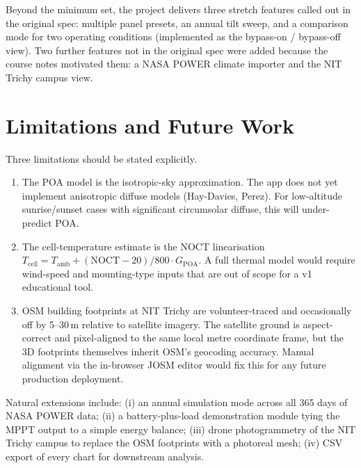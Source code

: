 \documentclass[conference]{IEEEtran}
\begin{document}
Beyond the minimum set, the project delivers three stretch features called out in the original spec: multiple panel presets, an annual tilt sweep, and a comparison mode for two operating conditions (implemented as the bypass-on / bypass-off view). Two further features not in the original spec were added because the course notes motivated them: a NASA POWER climate importer and the NIT Trichy campus view.

\section{Limitations and Future Work}
Three limitations should be stated explicitly.

\begin{enumerate}
\item The POA model is the isotropic-sky approximation. The app does not yet implement anisotropic diffuse models (Hay-Davies, Perez). For low-altitude sunrise/sunset cases with significant circumsolar diffuse, this will under-predict POA.
\item The cell-temperature estimate is the NOCT linearisation $T_\text{cell}=T_\text{amb}+(\text{NOCT}-20)/800\cdot G_\text{POA}$. A full thermal model would require wind-speed and mounting-type inputs that are out of scope for a v1 educational tool.
\item OSM building footprints at NIT Trichy are volunteer-traced and occasionally off by 5--30\,m relative to satellite imagery. The satellite ground is aspect-correct and pixel-aligned to the same local metre coordinate frame, but the 3D footprints themselves inherit OSM's geocoding accuracy. Manual alignment via the in-browser JOSM editor would fix this for any future production deployment.
\end{enumerate}

Natural extensions include: (i) an annual simulation mode across all 365 days of NASA POWER data; (ii) a battery-plus-load demonstration module tying the MPPT output to a simple energy balance; (iii) drone photogrammetry of the NIT Trichy campus to replace the OSM footprints with a photoreal mesh; (iv) CSV export of every chart for downstream analysis.
\end{document}
